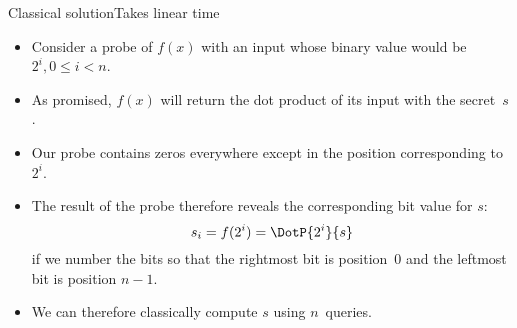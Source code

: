 \begin{frame}{Classical solution}{Takes linear time}

\begin{itemize}
    \item Consider a probe of $f(x)$ with an input whose binary value would be~$2^{i}, 0 \leq i < n$.
    \item As promised, $f(x)$ will return the dot product of its input with the secret~$s$.
    \item Our probe contains zeros everywhere except in the position corresponding to~$2^i$.
    \item The result of the probe therefore reveals the corresponding bit value for $s$:
    \[ s_{i} = f(2^{i}) = \DotP{2^i}{s} \]
    if we number the bits so that the rightmost bit is position~$0$ and the leftmost bit is position $n-1$.
    \item We can therefore classically compute $s$ using $n$~queries.
\end{itemize}
    
\end{frame}


